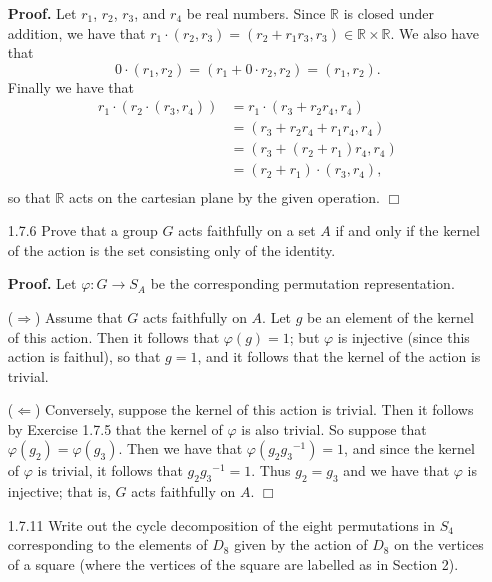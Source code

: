 \documentclass[9pt]{article}
\newcommand{\qed}{\hfill \ensuremath{\Box}}
\newcommand{\R}{\mathbb{R}}
\begin{document}
\begin{enumerate}
      \textbf{Proof.} Let $r_1$, $r_2$, $r_3$, and $r_4$ be real numbers. Since
      $\R$ is closed under addition, we have that
      $r_1 \cdot (r_2, r_3) = (r_2 + r_1r_3, r_3) \in \R \times \R$. We also
      have that
      $$0 \cdot (r_1, r_2) = (r_1 + 0 \cdot r_2, r_2) = (r_1, r_2).$$
      Finally we have that
      \begin{align*}
         r_1 \cdot (r_2 \cdot (r_3, r_4)) &= r_1 \cdot (r_3 + r_2r_4, r_4) \\
            &= (r_3 + r_2r_4 + r_1r_4, r_4) \\
            &= (r_3 + (r_2 + r_1)r_4, r_4) \\
            &= (r_2 + r_1) \cdot (r_3, r_4), \\
      \end{align*}
      so that $\R$ acts on the cartesian plane by the given operation. \qed
   \item[1.7.6]   Prove that a group $G$ acts faithfully on a set $A$ if and
                  only if the kernel of the action is the set consisting only of
                  the identity.

      \textbf{Proof.} Let $\varphi : G \rightarrow S_A$ be the corresponding 
      permutation representation.

      ($\Rightarrow$) Assume that $G$ acts faithfully on $A$. Let $g$ be an
      element of the kernel of this action. Then it follows that
      $\varphi(g) = 1$; but $\varphi$ is injective (since this action is
      faithul), so that $g = 1$, and it follows that the kernel of the action is
      trivial.

      ($\Leftarrow$) Conversely, suppose the kernel of this action is trivial.
      Then it follows by Exercise 1.7.5 that the kernel of $\varphi$ is also
      trivial. So suppose that $\varphi(g_2) = \varphi(g_3)$. Then we have
      that $\varphi(g_2{g_3}^{-1}) = 1$, and since the kernel of $\varphi$ is 
      trivial, it follows that $g_2{g_3}^{-1} = 1$. Thus $g_2 = g_3$ and we
      have that $\varphi$ is injective; that is, $G$ acts faithfully on $A$.
      \qed
   \item[1.7.11]  Write out the cycle decomposition of the eight permutations in
                  $S_4$ corresponding to the elements of $D_8$ given by the
                  action of $D_8$ on the vertices of a square (where the
                  vertices of the square are labelled as in Section 2).


\end{enumerate}
\end{document}
